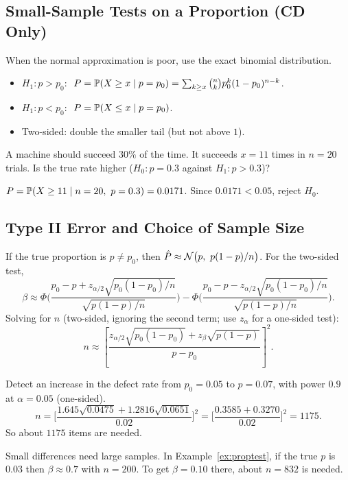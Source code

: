 \subsection{Small-Sample Tests on a Proportion (CD Only)}

When the normal approximation is poor, use the exact binomial distribution.
\begin{itemize}
  \item $H_1:p>p_0$: $\ P=\mathbb{P}(X\ge x\mid p=p_0)=\sum_{k\ge x}\binom nkp_0^k(1-p_0)^{n-k}$.
  \item $H_1:p<p_0$: $\ P=\mathbb{P}(X\le x\mid p=p_0)$.
  \item Two-sided: double the smaller tail (but not above $1$).
\end{itemize}

\begin{example}
A machine should succeed $30\%$ of the time. It succeeds $x=11$ times in $n=20$ trials. Is the true rate higher ($H_0:p=0.3$ against $H_1:p>0.3$)?

$P=\Prob(X\ge11\mid n=20,\ p=0.3)=0.0171$. Since $0.0171<0.05$, reject $H_0$.
\end{example}

\subsection{Type II Error and Choice of Sample Size}

If the true proportion is $p\ne p_0$, then $\hat{P}\approx\Normal\big(p,\ p(1-p)/n\big)$. For the two-sided test,
\[ \beta\approx\Phi\Big(\frac{p_0-p+z_{\alpha/2}\sqrt{p_0(1-p_0)/n}}{\sqrt{p(1-p)/n}}\Big)-\Phi\Big(\frac{p_0-p-z_{\alpha/2}\sqrt{p_0(1-p_0)/n}}{\sqrt{p(1-p)/n}}\Big). \]
Solving for $n$ (two-sided, ignoring the second term; use $z_\alpha$ for a one-sided test):
\[ n\approx\left[\frac{z_{\alpha/2}\sqrt{p_0(1-p_0)}+z_\beta\sqrt{p(1-p)}}{p-p_0}\right]^2. \]

\begin{example}
Detect an increase in the defect rate from $p_0=0.05$ to $p=0.07$, with power $0.9$ at $\alpha=0.05$ (one-sided).
\[ n=\Big[\frac{1.645\sqrt{0.0475}+1.2816\sqrt{0.0651}}{0.02}\Big]^2=\Big[\frac{0.3585+0.3270}{0.02}\Big]^2=1175. \]
So about $1175$ items are needed.

Small differences need large samples. In Example~\ref{ex:proptest}, if the true $p$ is $0.03$ then $\beta\approx0.7$ with $n=200$. To get $\beta=0.10$ there, about $n=832$ is needed.
\end{example}


